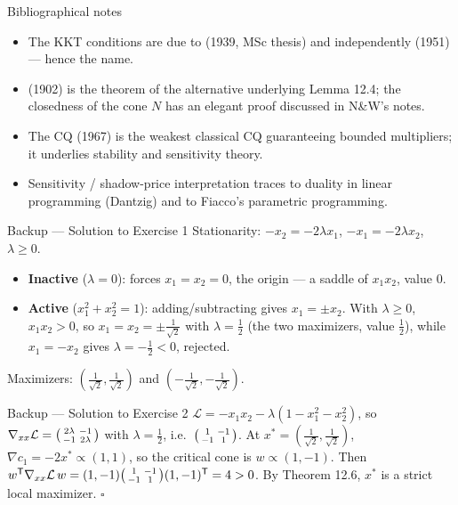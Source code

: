 \documentclass[aspectratio=169,10pt]{beamer}
\newcommand{\Lag}{\mathcal{L}}
\newcommand{\grad}{\nabla}
\newcommand{\T}{^{\mathsf{T}}}
\newenvironment{psmallmatrix}{\left(\begin{smallmatrix}}{\end{smallmatrix}\right)}
\newcommand{\xs}{x^{*}}
\begin{document}
\begin{frame}{Bibliographical notes}
  \begin{itemize}
    \item The KKT conditions are due to  (1939, MSc thesis) and independently
       (1951) — hence the name.
    \item {} (1902) is the theorem of the alternative underlying Lemma 12.4; the
      closedness of the cone $N$ has an elegant proof discussed in N\&W's notes.
    \item The  CQ (1967) is the weakest classical CQ guaranteeing bounded
      multipliers; it underlies stability and sensitivity theory.
    \item Sensitivity / shadow-price interpretation traces to duality in linear programming (Dantzig) and
      to Fiacco's parametric programming.
  \end{itemize}
\end{frame}

\appendix

\begin{frame}{Backup — Solution to Exercise 1}
  Stationarity: $-x_2=-2\lambda x_1$, $-x_1=-2\lambda x_2$, $\lambda\ge0$.
  \begin{itemize}
    \item \textbf{Inactive} ($\lambda=0$): forces $x_1=x_2=0$, the origin — a saddle of $x_1x_2$, value $0$.
    \item \textbf{Active} ($x_1^2+x_2^2=1$): adding/subtracting gives $x_1=\pm x_2$. With $\lambda\ge0$,
      $x_1x_2>0$, so $x_1=x_2=\pm\tfrac1{\sqrt2}$ with $\lambda=\tfrac12$ (the two maximizers, value $\tfrac12$),
      while $x_1=-x_2$ gives $\lambda=-\tfrac12<0$, rejected.
  \end{itemize}
  Maximizers: $(\tfrac1{\sqrt2},\tfrac1{\sqrt2})$ and $(-\tfrac1{\sqrt2},-\tfrac1{\sqrt2})$.
\end{frame}

\begin{frame}{Backup — Solution to Exercise 2}
  $\Lag=-x_1x_2-\lambda(1-x_1^2-x_2^2)$, so
  $\grad_{xx}\Lag=\begin{psmallmatrix}2\lambda & -1\\ -1 & 2\lambda\end{psmallmatrix}$ with $\lambda=\tfrac12$,
  i.e.\ $\begin{psmallmatrix}1&-1\\-1&1\end{psmallmatrix}$.
  At $\xs=(\tfrac1{\sqrt2},\tfrac1{\sqrt2})$, $\grad c_1=-2\xs\propto(1,1)$, so the critical cone is
  $w\propto(1,-1)$. Then $w\T\grad_{xx}\Lag\,w=(1,-1)\begin{psmallmatrix}1&-1\\-1&1\end{psmallmatrix}(1,-1)\T=4>0$.
  By Theorem 12.6, $\xs$ is a strict local maximizer. \hfill$\square$
\end{frame}
\end{document}

